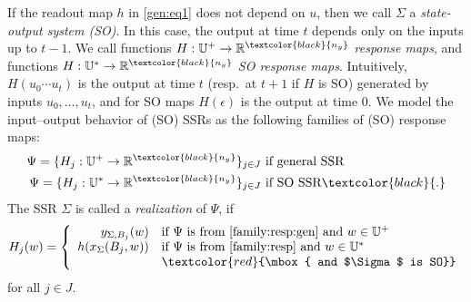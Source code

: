 \documentclass[journal,twoside,web]{ieeecolor}
\begin{document}
If the readout map $h$ in \eqref{gen:eq1} does not depend on $u$, then we call $\Sigma$ a \emph{state-output system (SO)}. In this case, the output at time $t$ depends only on the inputs up to $t-1$.
We call functions $H:\mathbb{U}^{+}\to\mathbb{R}^{\textcolor{black}{n_y}}$ \emph{response maps}, and functions $H:\mathbb{U}^{*}\to\mathbb{R}^{\textcolor{black}{n_y}}$ \emph{SO response maps}. Intuitively, $H(u_0\cdots u_t)$ is the output at time $t$ (resp.\ at $t+1$ if $H$ is SO) generated by inputs $u_0,\ldots,u_t$, and for SO maps $H(\epsilon)$ is the output at time $0$. 
We model the input--output behavior of (SO) SSRs as the following families 
of (SO) response maps: %
\begin{align}
    \Psi=\{H_j:\mathbb{U}^{+}\rightarrow \mathbb{R}^{\textcolor{black}{n_y}}\}_{j \in J} & \mbox{ if general SSR} 
    \label{family:resp:gen}
    \\
    \Psi=\{ H_j:\mathbb{U}^{*}\rightarrow \mathbb{R}^{\textcolor{black}{n_y}}\}_{j \in J} & \mbox{ if SO SSR}  \textcolor{black}{.}
    \label{family:resp}
\end{align}
The SSR $\Sigma$ is called a \emph{realization} of $\Psi$, if 
\[
    H_j(w)=\left\{\begin{array}{rl}
             y_{\Sigma,B_j}(w) & \mbox{if $\Psi$ is from \eqref{family:resp:gen} and $w\in\mathbb{U}^{+}$} \\
	     h(x_{\Sigma}(B_j,w)) & \mbox{if $\Psi$ is from \eqref{family:resp} and $w \in \mathbb{U}^{*}$} \\
	                           & \textcolor{red}{\mbox{ and $\Sigma$ is SO}}
             \end{array}\right. 
\]
for all $j \in J$. %
%
\end{document}
